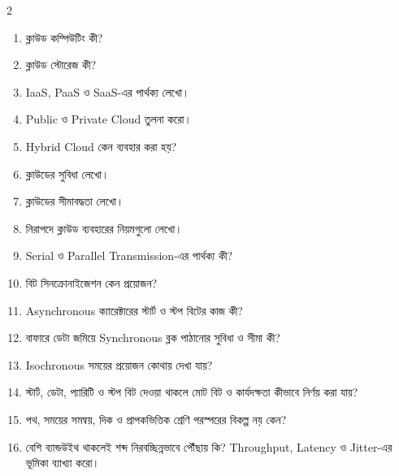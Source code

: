\begin{multicols}{2}
\begin{enumerate}
\item ক্লাউড কম্পিউটিং কী?
\item ক্লাউড স্টোরেজ কী?
\item IaaS, PaaS ও SaaS-এর পার্থক্য লেখো।
\item Public ও Private Cloud তুলনা করো।
\item Hybrid Cloud কেন ব্যবহার করা হয়?
\item ক্লাউডের সুবিধা লেখো।
\item ক্লাউডের সীমাবদ্ধতা লেখো।
\item নিরাপদে ক্লাউড ব্যবহারের নিয়মগুলো লেখো।
\item Serial ও Parallel Transmission-এর পার্থক্য কী?
\item বিট সিনক্রোনাইজেশন কেন প্রয়োজন?
\item Asynchronous ক্যারেক্টারের স্টার্ট ও স্টপ বিটের কাজ কী?
\item বাফারে ডেটা জমিয়ে Synchronous ব্লক পাঠানোর সুবিধা ও সীমা কী?
\item Isochronous সময়ের প্রয়োজন কোথায় দেখা যায়?
\item স্টার্ট, ডেটা, প্যারিটি ও স্টপ বিট দেওয়া থাকলে মোট বিট ও কার্যদক্ষতা কীভাবে নির্ণয় করা যায়?
\item পথ, সময়ের সমন্বয়, দিক ও প্রাপকভিত্তিক শ্রেণি পরস্পরের বিকল্প নয় কেন?
\item বেশি ব্যান্ডউইথ থাকলেই শব্দ নিরবচ্ছিন্নভাবে পৌঁছায় কি? Throughput, Latency ও Jitter-এর ভূমিকা ব্যাখ্যা করো।
\end{enumerate}\end{multicols}
